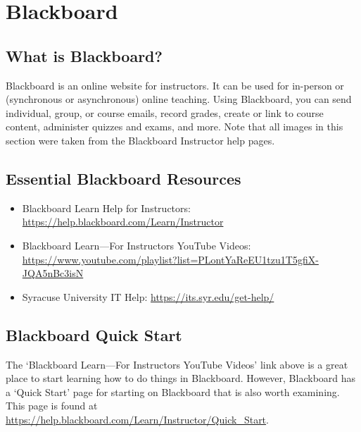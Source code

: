 \newpage
\section{Blackboard}

\subsection{What is Blackboard?}

Blackboard is an online website for instructors. It can be used for in-person or (synchronous or asynchronous) online teaching. Using Blackboard, you can send individual, group, or course emails, record grades, create or link to course content, administer quizzes and exams, and more. Note that all images in this section were taken from the Blackboard Instructor help pages.



\subsection{Essential Blackboard Resources}

        \begin{itemize}
        \item Blackboard Learn Help for Instructors: \url{https://help.blackboard.com/Learn/Instructor}
        
        \item Blackboard Learn---For Instructors YouTube Videos: \url{https://www.youtube.com/playlist?list=PLontYaReEU1tzu1T5gfiX-JQA5nBc3isN}
        
        \item Syracuse University IT Help: \url{https://its.syr.edu/get-help/}
        \end{itemize}


\subsection{Blackboard Quick Start}

The `Blackboard Learn---For Instructors YouTube Videos' link above is a great place to start learning how to do things in Blackboard. However, Blackboard has a `Quick Start' page for starting on Blackboard that is also worth examining. This page is found at \url{https://help.blackboard.com/Learn/Instructor/Quick_Start}.



